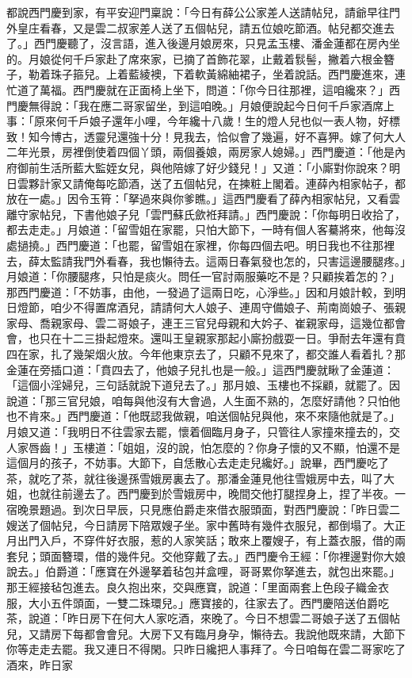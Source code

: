 都說西門慶到家，有平安迎門稟說：「今日有薛公公家差人送請帖兒，請爺早往門外皇庄看春，又是雲二叔家差人送了五個帖兒，請五位娘吃節酒。帖兒都交進去了。」西門慶聽了，沒言語，進入後邊月娘房來，只見孟玉樓、潘金蓮都在房內坐的。月娘從何千戶家赴了席來家，已摘了首飾花翠，止戴着䯼髻，撇着六根金簪子，勒着珠子箍兒。上着藍綾襖，下着軟黃綿紬裙子，坐着說話。西門慶進來，連忙道了萬福。西門慶就在正面椅上坐下，問道：「你今日往那裡，這咱纔來？」西門慶無得說：「我在應二哥家留坐，到這咱晚。」月娘便說起今日何千戶家酒席上事：「原來何千戶娘子還年小哩，今年纔十八歲！生的燈人兒也似一表人物，好標致！知今博古，透靈兒還強十分！見我去，恰似會了幾遍，好不喜狎。嫁了何大人二年光景，房裡倒使着四個丫頭，兩個養娘，兩房家人媳婦。」西門慶道：「他是內府御前生活所藍大監姪女兒，與他陪嫁了好少錢兒！」又道：「小廝對你說來？明日雲夥計家又請俺每吃節酒，送了五個帖兒，在揀粧上閣着。連薛內相家帖子，都放在一處。」因令玉筲：「拏過來與你爹瞧。」這西門慶看了薛內相家帖兒，又看雲離守家帖兒，下書他娘子兒「雲門蘇氏歛袵拜請。」西門慶說：「你每明日收拾了，都去走走。」月娘道：「留雪姐在家罷，只怕大節下，一時有個人客驀將來，他每沒處撾撓。」西門慶道：「也罷，留雪姐在家裡，你每四個去吧。明日我也不往那裡去，薛太監請我門外看春，我也懶待去。這兩日春氣發也怎的，只害這邊腰腿疼。」月娘道：「你腰腿疼，只怕是痰火。問任一官討兩服藥吃不是？只顧挨着怎的？」那西門慶道：「不妨事，由他，一發過了這兩日吃，心淨些。」因和月娘計較，到明日燈節，咱少不得置席酒兒，請請何大人娘子、連周守備娘子、荊南崗娘子、張親家母、喬親家母、雲二哥娘子，連王三官兒母親和大妗子、崔親家母，這幾位都會會，也只在十二三掛起燈來。還叫王皇親家那起小廝扮戲耍一日。爭耐去年還有賁四在家，扎了幾架烟火放。今年他東京去了，只顧不見來了，都交誰人看着扎？那金蓮在旁插口道：「賁四去了，他娘子兒扎也是一般。」這西門慶就瞅了金蓮道：「這個小淫婦兒，三句話就說下道兒去了。」那月娘、玉樓也不採顧，就罷了。因說道：「那三官兒娘，咱每與他沒有大會過，人生面不熟的，怎麼好請他？只怕他也不肯來。」西門慶道：「他既認我做親，咱送個帖兒與他，來不來隨他就是了。」月娘又道：「我明日不往雲家去罷，懷着個臨月身子，只管往人家撞來撞去的，交人家唇齒！」玉樓道：「姐姐，沒的說，怕怎麼的？你身子懷的又不顯，怕還不是這個月的孩子，不妨事。大節下，自恁散心去走走兒纔好。」說畢，西門慶吃了茶，就吃了茶，就往後邊孫雪娥房裏去了。那潘金蓮見他往雪娥房中去，叫了大姐，也就往前邊去了。西門慶到於雪娥房中，晚間交他打腿捏身上，捏了半夜。一宿晚景題過。到次日早辰，只見應伯爵走來借衣服頭面，對西門慶說：「昨日雲二嫂送了個帖兒，今日請房下陪眾嫂子坐。家中舊時有幾件衣服兒，都倒塌了。大正月出門入戶，不穿件好衣服，惹的人家笑話；敢來上覆嫂子，有上蓋衣服，借的兩套兒；頭面簪環，借的幾件兒。交他穿戴了去。」西門慶令王經：「你裡邊對你大娘說去。」伯爵道：「應寶在外邊拏着毡包并盒哩，哥哥累你拏進去，就包出來罷。」那王經接毡包進去。良久抱出來，交與應寶，說道：「里面兩套上色段子織金衣服，大小五件頭面，一雙二珠環兒。」應寶接的，往家去了。西門慶陪送伯爵吃茶，說道：「昨日房下在何大人家吃酒，來晚了。今日不想雲二哥娘子送了五個帖兒，又請房下每都會會兒。大房下又有臨月身孕，懶待去。我說他既來請，大節下你等走走去罷。我又連日不得閑。只昨日纔把人事拜了。今日咱每在雲二哥家吃了酒來，昨日家